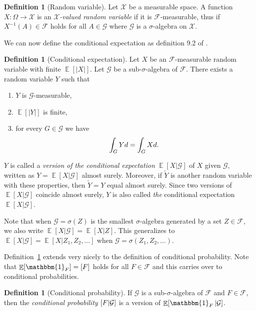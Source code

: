 \documentclass[a4paper]{report}
\theoremstyle{plain}
\theoremstyle{definition}
\newtheorem{definition}[theorem]{Definition}
\theoremstyle{remark}
\numberwithin{equation}{chapter}
\let\P\relax
\DeclareMathOperator{\P}{\mathbb{P}}
\DeclareMathOperator{\E}{\mathbb{E}}
\DeclareMathOperator{\1}{\mathbbm{1}}
\newcommand{\F}{\mathcal{F}}
\renewcommand{\G}{\mathcal{G}}
\newcommand{\X}{\mathcal{X}}
\begin{document}
\begin{definition}[Random variable]
Let $\X$ be a measurable space. A function $X\colon\Omega\to\X$ is an \emph{$\X$-valued random variable} if it is $\F$-measurable, thus if $X^{-1}(A)\in\F$ holds for all $A\in\G$ where $\G$ is a $\sigma$-algebra on $\X$.
\end{definition}

We can now define the conditional expectation as definition 9.2 of \cite{Williams91}.

\begin{definition}[Conditional expectation]\label{def:conexp}
Let $X$ be an $\F$-measurable random variable with finite $\E[|X|]$. Let $\G$ be a sub-$\sigma$-algebra of $\F$. There exists a random variable $Y$ such that
\begin{enumerate}
\item $Y$ is $\G$-measurable,
\item $\E[|Y|]$ is finite,
\item for every $G\in\G$ we have
\begin{equation}
\int_G Yd\P=\int_G Xd\P.
\end{equation}
\end{enumerate}
$Y$ is called a \emph{version of the conditional expectation} $\E[X|\G]$ of $X$ given $\G$, written as $Y=\E[X|\G]$ almost surely. Moreover, if $\tilde{Y}$ is another random variable with these properties, then $\tilde{Y}=Y$ equal almost surely. Since two versions of $\E[X|\G]$ coincide almost surely, $Y$ is also called \emph{the} conditional expectation $\E[X|\G]$.
\end{definition}

Note that when $\G=\sigma(Z)$ is the smallest $\sigma$-algebra generated by a set $Z\in\F$, we also write $\E[X|\G]=\E[X|Z]$. This generalizes to $\E[X|\G]=\E[X|Z_1,Z_2,\ldots]$ when $\G=\sigma(Z_1,Z_2,\ldots)$.

Definition~\ref{def:conexp} extends very nicely to the definition of conditional probability. Note that $\E[\1_F]=\P[F]$ holds for all $F\in\F$ and this carries over to conditional probabilities.

\begin{definition}[Conditional probability]
If $\G$ is a sub-$\sigma$-algebra of $\F$ and $F\in\F$, then the \emph{conditional probability} $\P[F|\G]$ is a version of $\E[\1_F|\G]$.
\end{definition}
\end{document}
